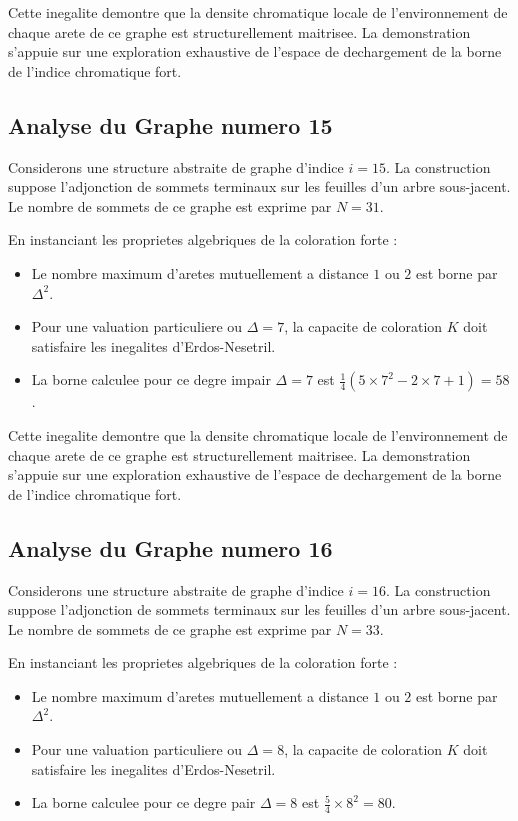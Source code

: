 \documentclass[11pt,a4paper]{article}
\begin{document}
Cette inegalite demontre que la densite chromatique locale de l'environnement de chaque arete de ce graphe est structurellement maitrisee. La demonstration s'appuie sur une exploration exhaustive de l'espace de dechargement de la borne de l'indice chromatique fort.

\subsection{Analyse du Graphe numero 15}
Considerons une structure abstraite de graphe d'indice $i = 15$. La construction suppose l'adjonction de sommets terminaux sur les feuilles d'un arbre sous-jacent. Le nombre de sommets de ce graphe est exprime par $N = 31$.

En instanciant les proprietes algebriques de la coloration forte :
\begin{itemize}
\item Le nombre maximum d'aretes mutuellement a distance $1$ ou $2$ est borne par $\Delta^2$.
\item Pour une valuation particuliere ou $\Delta = 7$, la capacite de coloration $K$ doit satisfaire les inegalites d'Erdos-Nesetril.
\item La borne calculee pour ce degre impair $\Delta = 7$ est $\frac{1}{4}(5 \times 7^2 - 2 \times 7 + 1) = 58$.
\end{itemize}

Cette inegalite demontre que la densite chromatique locale de l'environnement de chaque arete de ce graphe est structurellement maitrisee. La demonstration s'appuie sur une exploration exhaustive de l'espace de dechargement de la borne de l'indice chromatique fort.

\subsection{Analyse du Graphe numero 16}
Considerons une structure abstraite de graphe d'indice $i = 16$. La construction suppose l'adjonction de sommets terminaux sur les feuilles d'un arbre sous-jacent. Le nombre de sommets de ce graphe est exprime par $N = 33$.

En instanciant les proprietes algebriques de la coloration forte :
\begin{itemize}
\item Le nombre maximum d'aretes mutuellement a distance $1$ ou $2$ est borne par $\Delta^2$.
\item Pour une valuation particuliere ou $\Delta = 8$, la capacite de coloration $K$ doit satisfaire les inegalites d'Erdos-Nesetril.
\item La borne calculee pour ce degre pair $\Delta = 8$ est $\frac{5}{4} \times 8^2 = 80$.
\end{itemize}
\end{document}
